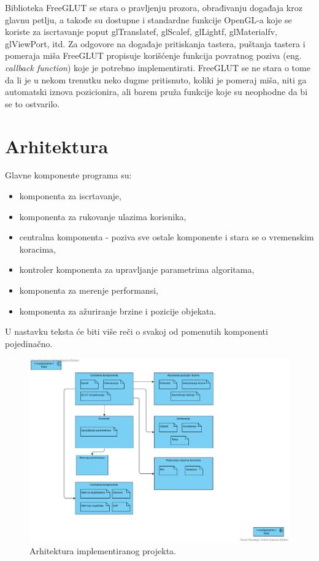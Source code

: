 \documentclass[12pt,oneside]{memoir}
\begin{document}
Biblioteka FreeGLUT se stara o pravljenju prozora, obrađivanju događaja kroz glavnu petlju,
a takođe su dostupne i standardne funkcije OpenGL-a koje se koriste
za iscrtavanje poput glTranslatef, glScalef, glLightf, glMaterialfv, glViewPort, itd.
Za odgovore na događaje pritiskanja tastera, puštanja tastera i pomeraja miša
FreeGLUT propisuje korišćenje funkcija povratnog poziva  (eng. {\em callback function}) koje je potrebno implementirati.
FreeGLUT se ne stara o tome da li je u nekom trenutku neko dugme pritisnuto, 
koliki je pomeraj miša, niti ga automatski iznova pozicionira, ali barem pruža 
funkcije koje su neophodne da bi se to ostvarilo.

\section{Arhitektura}

Glavne komponente programa su:
\begin{itemize}
	\item komponenta za iscrtavanje,
	\item komponenta za rukovanje ulazima korisnika,
	\item centralna komponenta - poziva sve ostale komponente i stara se o vremenskim koracima,
	\item kontroler komponenta za upravljanje parametrima algoritama,
	\item komponenta za merenje performansi,
	\item komponenta za ažuriranje brzine i pozicije objekata.
\end{itemize}

U nastavku teksta će biti više reči o svakoj od pomenutih komponenti pojedinačno.

\begin{figure}[h!]
	\centerfloat
	\includegraphics[trim=10 50 100 40,clip,scale=0.9]{archi2.pdf}
	\caption{Arhitektura implementiranog projekta.}
	\label{fig:archi}
\end{figure}
\end{document}
